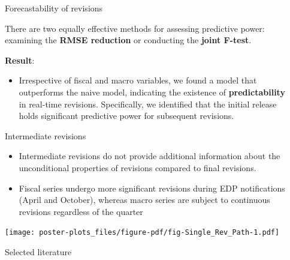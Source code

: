 \documentclass[final]{beamer}
\newlength{\sepwidth}
\newlength{\colwidth}
\newcommand{\separatorcolumn}{\begin{column}{\sepwidth}\end{column}}
\begin{document}
\begin{frame}[t]
\begin{columns}[t]
\begin{column}{\colwidth}
\begin{block}{Forecastability of revisions}
    \vspace*{0.5cm}

    There are two equally effective methods for assessing predictive power: examining the \textbf{RMSE reduction} or conducting the \textbf{joint F-test}.

    \vspace*{0.5cm}
    \textbf{Result}:
    \begin{itemize}
      \item Irrespective of fiscal and macro variables, we found a model that outperforms the naive model, indicating the existence of \textbf{predictability} in real-time revisions. Specifically, we identified that the initial release holds significant predictive power for subsequent revisions.
    \end{itemize} 

  \end{block}

  \begin{block}{Intermediate revisions}

    \begin{itemize}
      \item Intermediate revisions do not provide additional information about the unconditional properties of revisions compared to final revisions.
      \item Fiscal series undergo more significant revisions during EDP notifications (April and October), whereas macro series are subject to continuous revisions regardless of the quarter
    \end{itemize} 

    \texttt{[image: poster-plots\_files/figure-pdf/fig-Single\_Rev\_Path-1.pdf]} 

  \end{block}

  \begin{block}{Selected literature}
    \nocite{*}
    \footnotesize{}

  \end{block}

\end{column}

\separatorcolumn
\end{columns}
\end{frame}
\end{document}
